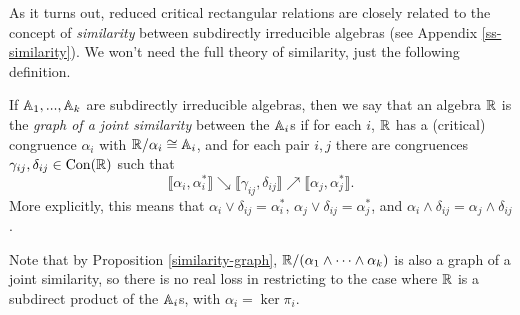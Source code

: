 \documentclass[letterpaper,11pt]{article}
\DeclareMathOperator{\Con}{Con}
\begin{document}
As it turns out, reduced critical rectangular relations are closely related to the concept of \emph{similarity} between subdirectly irreducible algebras (see Appendix \ref{ss-similarity}). We won't need the full theory of similarity, just the following definition.

\begin{defn} If $\mathbb{A}_1, ..., \mathbb{A}_k$ are subdirectly irreducible algebras, then we say that an algebra $\mathbb{R}$ is the \emph{graph of a joint similarity} between the $\mathbb{A}_i$s if for each $i$, $\mathbb{R}$ has a (critical) congruence $\alpha_i$ with $\mathbb{R}/\alpha_i \cong \mathbb{A}_i$, and for each pair $i,j$ there are congruences $\gamma_{ij}, \delta_{ij} \in \Con(\RR)$ such that
\[
\llbracket \alpha_i, \alpha_i^* \rrbracket \searrow \llbracket \gamma_{ij}, \delta_{ij} \rrbracket \nearrow \llbracket \alpha_j, \alpha_j^*\rrbracket.
\]
More explicitly, this means that $\alpha_i \vee \delta_{ij} = \alpha_i^*$, $\alpha_j \vee \delta_{ij} = \alpha_j^*$, and $\alpha_i \wedge \delta_{ij} = \alpha_j \wedge \delta_{ij}$.

Note that by Proposition \ref{similarity-graph}, $\mathbb{R}/(\alpha_1 \wedge \cdots \wedge \alpha_k)$ is also a graph of a joint similarity, so there is no real loss in restricting to the case where $\mathbb{R}$ is a subdirect product of the $\mathbb{A}_i$s, with $\alpha_i = \ker \pi_i$.
\end{defn}
\end{document}
